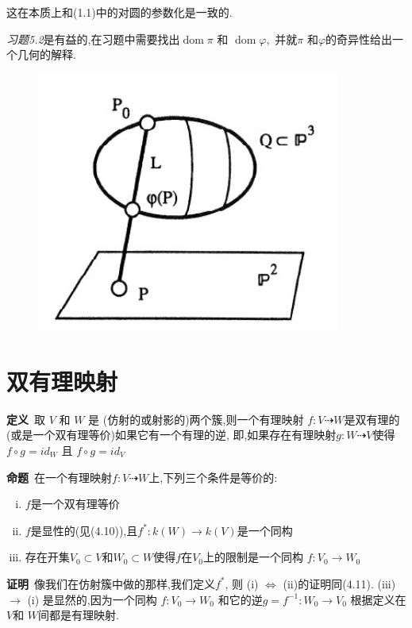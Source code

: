 \documentclass[UTF8]{book}
\begin{document}
		
		这在本质上和(1.1)中的对圆的参数化是一致的. 
		
		\textit{习题5.2}是有益的,在习题中需要找出$\operatorname{dom} \pi$ 和 $\operatorname{dom} \varphi,$ 并就$\pi$ 和$\varphi$的奇异性给出一个几何的解释.
		
		\begin{figure}[H]
			\centering
			\includegraphics[width=10cm]{57.jpg}\\
		\end{figure}
		
	\section{双有理映射}
		\textbf{定义}\ 取 $V$ 和 $W$ 是 (仿射的或射影的)两个簇,则一个有理映射
		$f:V \dashrightarrow W$是双有理的 (或是一个双有理等价)如果它有一个有理的逆, 即,如果存在有理映射$g: W \dashrightarrow V$使得 $f \circ g=id_{W}$ 且 $f \circ g=id_{V}$
		
		\textbf{命题}\ 在一个有理映射$f: V \dashrightarrow W$上,下列三个条件是等价的:
		\begin{enumerate}[(i)]
			\item $f$是一个双有理等价
			\item $ f $是显性的(见(4.10)),且$f ^{*}: k ( W ) \rightarrow k ( V )$是一个同构
			\item 存在开集$V _{0} \subset V$和$W _{0} \subset W$使得$f$在$V _{0}$上的限制是一个同构 $f : V _{0} \rightarrow W _{0}$
		\end{enumerate}
		
		
		\textbf{证明}\ 像我们在仿射簇中做的那样,我们定义$f^{*}$, 则 (i) $\Longleftrightarrow$ (ii)的证明同(4.11). (iii) $\rightarrow$ (i) 是显然的,因为一个同构 $f : V_{0} \rightarrow W_{0}$ 和它的逆$g = f ^{-1}: W _{0} \rightarrow V _{0}$ 根据定义在$V$和 $W$间都是有理映射.
		
\end{document}
